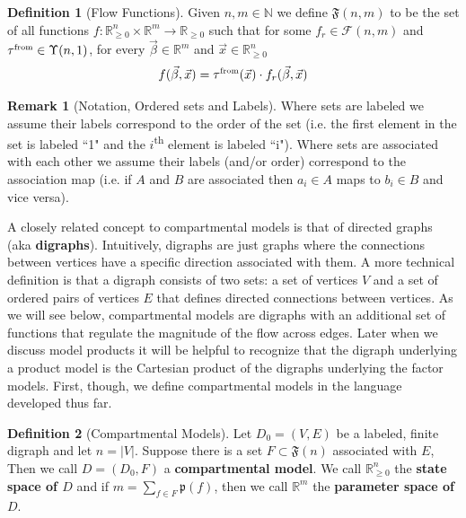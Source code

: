 \documentclass{article}
\theoremstyle{definition}
\newtheorem{definition}{Definition}
\newtheorem{remark}{Remark}
\newcommand{\N}{\mathbb{N}}%
\newcommand{\R}{\mathbb{R}}%
\newcommand{\Rnn}{\mathbb{R}_{\ge 0}}%
\newcommand{\abs}[1]{\lvert #1 \rvert}%
\newcommand{\flowfunc}[1]{\mathfrak{F}(#1)}%
\newcommand{\pardim}[1]{\mathfrak{p}(#1)}%
\newcommand{\betavec}{\vec{\beta}}
\newcommand{\xvec}{\vec{x}}
\newcommand{\fr}{\ensuremath{\mathcal F}}
\newcommand{\tauf}{\tau^{\mbox{\tiny from}}}
\begin{document}
\begin{definition}[Flow Functions]\label{flowfunc}
     Given $n,m\in\N$ we define $\flowfunc{n,m}$ to be the set of all functions $f:\Rnn^n\times\R^m\rightarrow\Rnn$ such that for some $f_r\in\fr(n,m)$ and $\tauf\in\Upsilon(n, 1)$, for every $\betavec\in\R^m$ and $\xvec\in\Rnn^n$
     \begin{equation}
        f(\betavec, \xvec) = \tauf(\xvec)\cdot f_r(\betavec, \xvec)
     \end{equation}
\end{definition}

\begin{remark}[Notation, Ordered sets and Labels]
    Where sets are labeled we assume their labels correspond to the order of the set (i.e. the first element in the set is labeled “1" and the $i$\textsuperscript{th} element is labeled ``i"). Where sets are associated with each other we assume their labels (and/or order) correspond to the association map (i.e. if $A$ and $B$ are associated then $a_i\in A$ maps to $b_i\in B$ and vice versa).  
\end{remark}

A closely related concept to compartmental models is that of directed graphs (aka \textbf{digraphs}). Intuitively, digraphs are just graphs where the connections between vertices have a specific direction associated with them. A more technical definition is that a digraph consists of two sets: a set of vertices $V$ and a set of ordered pairs of vertices $E$ that defines directed connections between vertices. As we will see below, compartmental models are digraphs with an additional set of functions that regulate the magnitude of the flow across edges. Later when we discuss model products it will be helpful to recognize that the digraph underlying a product model is the Cartesian product of the digraphs underlying the factor models. First, though, we define compartmental models in the language developed thus far.

\begin{definition}[Compartmental Models]\label{compmodel}
    Let $D_0=(V,E)$ be a labeled, finite digraph and let $n=\abs{V}$. Suppose there is a set $F\subset\flowfunc{n}$ associated with $E$, Then we call $D=(D_0, F)$ a \textbf{compartmental model}. We call $\Rnn^n$ the \textbf{state space of $D$} and if $m=\sum\limits_{f\in F}\pardim{f}$, then we call $\R^m$ the \textbf{parameter space of $D$}.
\end{definition}
\end{document}

